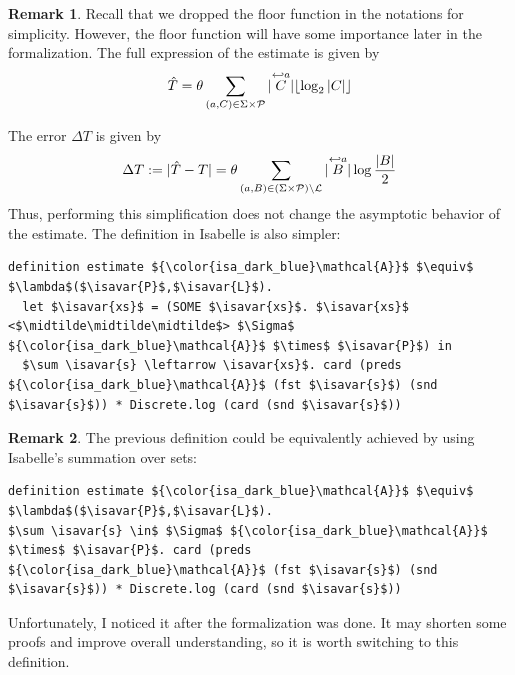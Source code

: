 \documentclass[12pt, a4 paper]{article}
\newcommand{\midtilde}{\raisebox{0.5ex}{\texttildelow}}
\newcommand{\isavar}[1]{{\color{isa_dark_green}\text{#1}}}
\theoremstyle{definition}
\newtheorem{remark}{Remark}
\begin{document}
\begin{remark}
Recall that we dropped the floor function in the notations for simplicity.
However, the floor function will have some importance later in the formalization.
The full expression of the estimate is given by
\begin{equation*}
    \hat{T} = \theta \sum_{(a, C) \in \Sigma\times \mathcal{P}} | \overset{\hookleftarrow {a}}{C} | \lfloor \log_2 | C | \rfloor
\end{equation*}
\end{remark}

\noindent
The error $\Delta T$ is given by
\begin{equation}
    \Delta T := |\hat{T} - T| = \theta \sum_{(a, B) \in (\Sigma\times \mathcal{P})\setminus \mathcal{L}} | \overset{\hookleftarrow {a}}{B} | \log \frac{| B |}{2}
\end{equation}
Thus, performing this simplification does not change the asymptotic behavior of the estimate.
The definition in Isabelle is also simpler:
\begin{lstlisting}[language=Isabelle]
definition estimate ${\color{isa_dark_blue}\mathcal{A}}$ $\equiv$ $\lambda$($\isavar{P}$,$\isavar{L}$).
  let $\isavar{xs}$ = (SOME $\isavar{xs}$. $\isavar{xs}$ <$\midtilde\midtilde\midtilde$> $\Sigma$ ${\color{isa_dark_blue}\mathcal{A}}$ $\times$ $\isavar{P}$) in
  $\sum \isavar{s} \leftarrow \isavar{xs}$. card (preds ${\color{isa_dark_blue}\mathcal{A}}$ (fst $\isavar{s}$) (snd $\isavar{s}$)) * Discrete.log (card (snd $\isavar{s}$))
\end{lstlisting}

\begin{remark}
The previous definition could be equivalently achieved by using Isabelle's summation over sets:
\begin{lstlisting}[language=Isabelle]
definition estimate ${\color{isa_dark_blue}\mathcal{A}}$ $\equiv$ $\lambda$($\isavar{P}$,$\isavar{L}$).
$\sum \isavar{s} \in$ $\Sigma$ ${\color{isa_dark_blue}\mathcal{A}}$ $\times$ $\isavar{P}$. card (preds ${\color{isa_dark_blue}\mathcal{A}}$ (fst $\isavar{s}$) (snd $\isavar{s}$)) * Discrete.log (card (snd $\isavar{s}$))
\end{lstlisting}
Unfortunately, I noticed it after the formalization was done. It may shorten some proofs and improve overall understanding, so it is worth switching to this definition.
\end{remark}
\end{document}
